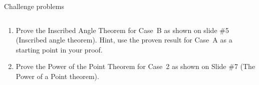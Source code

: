 \documentclass[9pt,aspectratio=169]{beamer}
\begin{document}
\begin{frame}{Challenge problems}
\begin{columns}[T]
\begin{column}{0.5\textwidth}
      \begin{enumerate}
        \conti
        \item Prove the Inscribed Angle Theorem for Case~B as shown on slide \#5 (Inscribed angle theorem).  Hint, use the proven result for Case~A as a starting point in your proof.

        \item Prove the Power of the Point Theorem for Case~2 as shown on Slide \#7 (The Power of a Point theorem).
      \end{enumerate}
    \end{column}
  \end{columns}
\end{frame}

\end{document}
